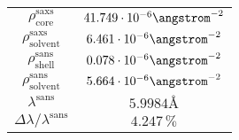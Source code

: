 \documentclass[\main/dresen_thesis.tex]{subfiles}
\begin{document}
\begin{table}[h]
\begin{tabular}{ c | l | l }
      \hline
      $\rho_\mathrm{core}^\mathrm{saxs}$
        & \multicolumn{2}{c}{$41.749 \cdot 10^{-6} \angstrom^{-2}$}\\
      $\rho_\mathrm{solvent}^\mathrm{saxs}$
        & \multicolumn{2}{c}{$6.461 \cdot 10^{-6} \angstrom^{-2}$}\\
      $\rho_\mathrm{shell}^\mathrm{sans}$
        & \multicolumn{2}{c}{$0.078 \cdot 10^{-6} \angstrom^{-2}$}\\
      $\rho_\mathrm{solvent}^\mathrm{sans}$
        & \multicolumn{2}{c}{$5.664 \cdot 10^{-6} \angstrom^{-2}$}\\
      $\lambda^\mathrm{sans}$
        & \multicolumn{2}{c}{$5.9984 \unit{\angstrom}$}\\
      $\Delta \lambda / \lambda ^\mathrm{sans}$
        & \multicolumn{2}{c}{$4.247 \, \%$}\\
      \hline
    \end{tabular}
  \end{table}
\end{document}

